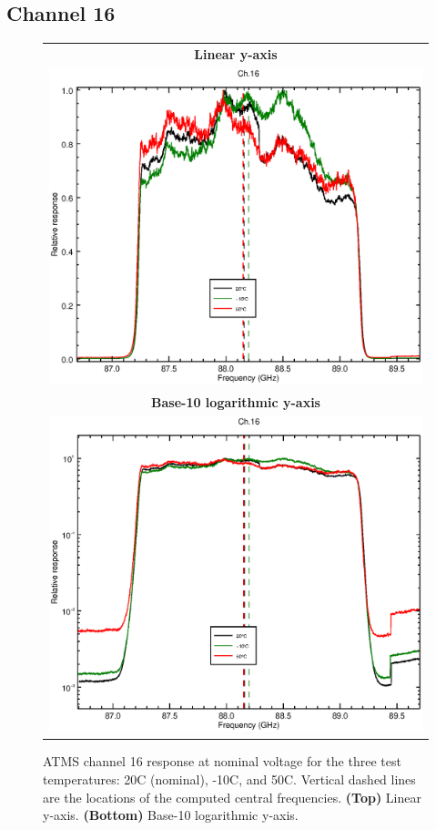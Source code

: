 \subsection{Channel 16}
\begin{figure}[H]
  \label{fig:Tset.ch16_response}
  \centering
  \begin{tabular}{c}
    \hspace{1.75cm}\sffamily\textbf{Linear y-axis} \\
    \includegraphics[scale=0.55]{graphics/srf/Tset/lin/atms_npp-16.eps} \\
    \hspace{1.75cm}\sffamily\textbf{Base-10 logarithmic y-axis} \\
    \includegraphics[scale=0.55]{graphics/srf/Tset/log/atms_npp-16.eps}
  \end{tabular}
  \caption{ATMS channel 16 response at nominal voltage for the three test temperatures: 20\textdegree{}C (nominal), -10\textdegree{}C, and 50\textdegree{}C. Vertical dashed lines are the locations of the computed central frequencies. \textbf{(Top)} Linear y-axis. \textbf{(Bottom)} Base-10 logarithmic y-axis.}
\end{figure}

